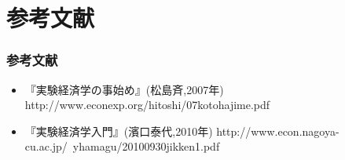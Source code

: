 \documentclass[dvipdfmx,12pt]{beamer}
\begin{document}
\section{参考文献}
\begin{frame}
\frametitle{参考文献}
\begin{itemize}\setlength{\parskip}{0.5em}
\item
『実験経済学の事始め』(松島斉,2007年)
http://www.econexp.org/hitoshi/07kotohajime.pdf
\item
『実験経済学入門』(濱口泰代,2010年)
http://www.econ.nagoya-cu.ac.jp/~yhamagu/20100930jikken1.pdf
\end{itemize}
\end{frame}
\end{document}
